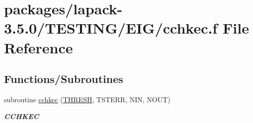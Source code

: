 \hypertarget{cchkec_8f}{}\section{packages/lapack-\/3.5.0/\+T\+E\+S\+T\+I\+N\+G/\+E\+I\+G/cchkec.f File Reference}
\label{cchkec_8f}
\subsection*{Functions/\+Subroutines}
\begin{DoxyCompactItemize}
\item 
subroutine \hyperlink{group__complex__eig_ga33af268bb77b50a691195ec96919e2f4}{cchkec} (\hyperlink{zlaqgs_8c_a0656018abfc9fa2821827415f5d5ea57}{T\+H\+R\+E\+S\+H}, T\+S\+T\+E\+R\+R, N\+I\+N, N\+O\+U\+T)
\begin{DoxyCompactList}\small\item\em {\bfseries C\+C\+H\+K\+E\+C} \end{DoxyCompactList}\end{DoxyCompactItemize}
